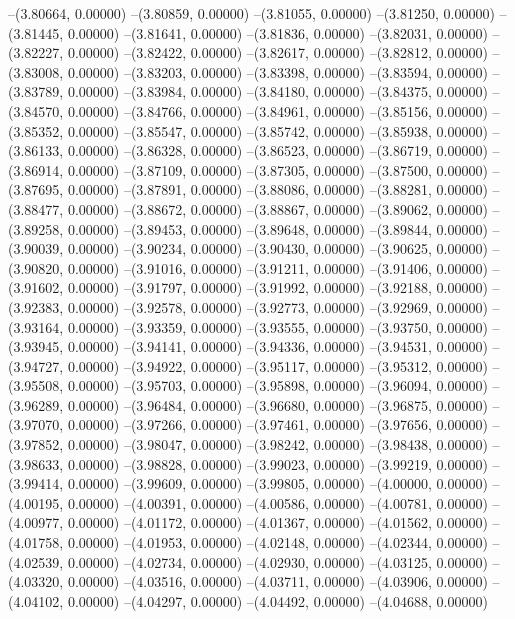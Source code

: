 --(3.80664, 0.00000)
--(3.80859, 0.00000)
--(3.81055, 0.00000)
--(3.81250, 0.00000)
--(3.81445, 0.00000)
--(3.81641, 0.00000)
--(3.81836, 0.00000)
--(3.82031, 0.00000)
--(3.82227, 0.00000)
--(3.82422, 0.00000)
--(3.82617, 0.00000)
--(3.82812, 0.00000)
--(3.83008, 0.00000)
--(3.83203, 0.00000)
--(3.83398, 0.00000)
--(3.83594, 0.00000)
--(3.83789, 0.00000)
--(3.83984, 0.00000)
--(3.84180, 0.00000)
--(3.84375, 0.00000)
--(3.84570, 0.00000)
--(3.84766, 0.00000)
--(3.84961, 0.00000)
--(3.85156, 0.00000)
--(3.85352, 0.00000)
--(3.85547, 0.00000)
--(3.85742, 0.00000)
--(3.85938, 0.00000)
--(3.86133, 0.00000)
--(3.86328, 0.00000)
--(3.86523, 0.00000)
--(3.86719, 0.00000)
--(3.86914, 0.00000)
--(3.87109, 0.00000)
--(3.87305, 0.00000)
--(3.87500, 0.00000)
--(3.87695, 0.00000)
--(3.87891, 0.00000)
--(3.88086, 0.00000)
--(3.88281, 0.00000)
--(3.88477, 0.00000)
--(3.88672, 0.00000)
--(3.88867, 0.00000)
--(3.89062, 0.00000)
--(3.89258, 0.00000)
--(3.89453, 0.00000)
--(3.89648, 0.00000)
--(3.89844, 0.00000)
--(3.90039, 0.00000)
--(3.90234, 0.00000)
--(3.90430, 0.00000)
--(3.90625, 0.00000)
--(3.90820, 0.00000)
--(3.91016, 0.00000)
--(3.91211, 0.00000)
--(3.91406, 0.00000)
--(3.91602, 0.00000)
--(3.91797, 0.00000)
--(3.91992, 0.00000)
--(3.92188, 0.00000)
--(3.92383, 0.00000)
--(3.92578, 0.00000)
--(3.92773, 0.00000)
--(3.92969, 0.00000)
--(3.93164, 0.00000)
--(3.93359, 0.00000)
--(3.93555, 0.00000)
--(3.93750, 0.00000)
--(3.93945, 0.00000)
--(3.94141, 0.00000)
--(3.94336, 0.00000)
--(3.94531, 0.00000)
--(3.94727, 0.00000)
--(3.94922, 0.00000)
--(3.95117, 0.00000)
--(3.95312, 0.00000)
--(3.95508, 0.00000)
--(3.95703, 0.00000)
--(3.95898, 0.00000)
--(3.96094, 0.00000)
--(3.96289, 0.00000)
--(3.96484, 0.00000)
--(3.96680, 0.00000)
--(3.96875, 0.00000)
--(3.97070, 0.00000)
--(3.97266, 0.00000)
--(3.97461, 0.00000)
--(3.97656, 0.00000)
--(3.97852, 0.00000)
--(3.98047, 0.00000)
--(3.98242, 0.00000)
--(3.98438, 0.00000)
--(3.98633, 0.00000)
--(3.98828, 0.00000)
--(3.99023, 0.00000)
--(3.99219, 0.00000)
--(3.99414, 0.00000)
--(3.99609, 0.00000)
--(3.99805, 0.00000)
--(4.00000, 0.00000)
--(4.00195, 0.00000)
--(4.00391, 0.00000)
--(4.00586, 0.00000)
--(4.00781, 0.00000)
--(4.00977, 0.00000)
--(4.01172, 0.00000)
--(4.01367, 0.00000)
--(4.01562, 0.00000)
--(4.01758, 0.00000)
--(4.01953, 0.00000)
--(4.02148, 0.00000)
--(4.02344, 0.00000)
--(4.02539, 0.00000)
--(4.02734, 0.00000)
--(4.02930, 0.00000)
--(4.03125, 0.00000)
--(4.03320, 0.00000)
--(4.03516, 0.00000)
--(4.03711, 0.00000)
--(4.03906, 0.00000)
--(4.04102, 0.00000)
--(4.04297, 0.00000)
--(4.04492, 0.00000)
--(4.04688, 0.00000)
